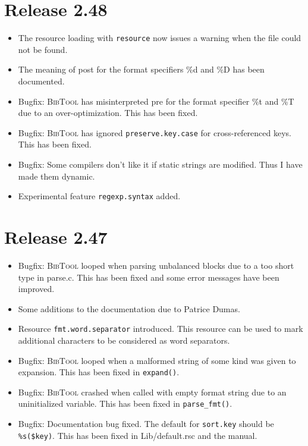 \documentclass[11pt,a4paper]{scrartcl}
\newcommand\rsc[1]{\texttt{#1}}
\newcommand\File[1]{\textsf{#1}}
\newcommand\BibTool{\textsc{BibTool}}
\newenvironment{Release}[2]{\section*{Release #1}\begin{itemize}}{\end{itemize}}
\newenvironment{Fix}[1]{\item }{}
\newenvironment{New}[1]{\item }{}
\newenvironment{Doc}[1]{\item }{}
\begin{document}
\begin{Release}{2.48}{August 6, 2004}
\begin{New}{gene}
    The resource loading with \rsc{resource} now issues a warning when
    the file could not be found.
  \end{New}
  \begin{Doc}{gene}
    The meaning of post for the format specifiers \%d and \%D has been
    documented.
  \end{Doc}
  \begin{Fix}{gene}
    Bugfix: \BibTool{} has misinterpreted pre for the format specifier \%t and
  \%T due to an over-optimization. This has been fixed.
  \end{Fix}
  \begin{Fix}{gene}
    Bugfix: \BibTool{} has ignored \rsc{preserve.key.case} for
    cross-referenced keys. This has been fixed.
  \end{Fix}
  \begin{Fix}{gene}
    Bugfix: Some compilers don't like it if static strings are modified. Thus
    I have made them dynamic.
  \end{Fix}
  \begin{New}{gene}
    Experimental feature \rsc{regexp.syntax} added.
  \end{New}
 \end{Release}

 \begin{Release}{2.47}{January 16, 2003}
  \begin{Fix}{gene}
    Bugfix: \BibTool{} looped when parsing unbalanced blocks due to a
    too short type in \File{parse.c}. This has been fixed and some
    error messages have been improved.
  \end{Fix}
  \begin{Doc}{gene}
    Some additions to the documentation due to Patrice Dumas.
  \end{Doc}
  \begin{New}{gene}
    Resource \rsc{fmt.word.separator} introduced. This resource can be
    used to mark additional characters to be considered as word separators.
  \end{New}
  \begin{Fix}{gene}
    Bugfix: \BibTool{} looped when a malformed string of some kind was
    given to expansion. This has been fixed in \verb|expand()|.
  \end{Fix}
  \begin{Fix}{gene}
    Bugfix: \BibTool{} crashed when called with empty format string due to an
    uninitialized variable. This has been fixed in \verb|parse_fmt()|.
  \end{Fix}
  \begin{Doc}{gene}
    Bugfix: Documentation bug fixed. The default for
    \rsc{sort.key} should be \verb|%s($key)|. This
    has been fixed in \File{Lib/default.rsc} and the manual.
  \end{Doc}
 \end{Release}
\end{document}
